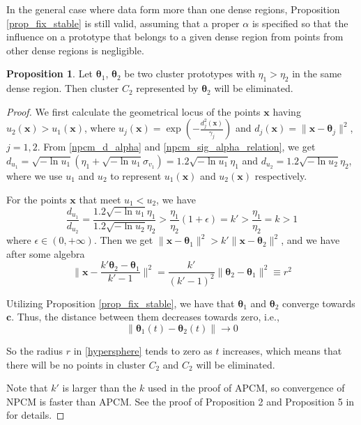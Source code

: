 \documentclass[conference]{IEEEtran}
\theoremstyle{definition}
\newtheorem*{proof}{Proof}
\newtheorem{prop}{Proposition}
\begin{document}
In the general case where data form more than one dense regions, Proposition \ref{prop_fix_stable} is still valid, assuming that a proper $\alpha$ is specified so that the influence on a prototype that belongs to a given dense region from points from other dense regions is negligible.

\begin{prop}
Let $\boldsymbol{\theta}_1$, $\boldsymbol{\theta}_2$ be two cluster prototypes with $\eta_1>\eta_2$ in the same dense region. Then cluster $C_2$ represented by $\boldsymbol{\theta}_2$ will be eliminated.
\label{prop_eliminate}
\end{prop}

\begin{proof}
 We first calculate the geometrical locus of the points $\mathbf{x}$ having $u_2(\mathbf{x})>u_1(\mathbf{x})$, where $u_j(\mathbf{x})=\exp\left(-\frac{d_j^2(\mathbf{x})}{\gamma_j}\right)$ and $d_j(\mathbf{x})=\|\mathbf{x} - \boldsymbol{\theta}_j\|^2$, $j=1,2$.
From \eqref{npcm_d_alpha} and \eqref{npcm_sig_alpha_relation}, we get $d_{u_1}=\sqrt{-\ln u_1}\left(\eta_1+\sqrt{-\ln u_1}\sigma_{v_1}\right)=1.2\sqrt{-\ln u_1}\eta_1$ and $d_{u_2}=1.2\sqrt{-\ln u_2}\eta_2$, where we use $u_1$ and $u_2$ to represent $u_1(\mathbf{x})$ and $u_2(\mathbf{x})$ respectively. 

For the points $\mathbf{x}$ that meet $u_1<u_2$, we have 
\begin{equation*}
\frac{d_{u_1}}{d_{u_2}}=\frac{1.2\sqrt{-\ln u_1}\eta_1}{1.2\sqrt{-\ln u_2}\eta_2}>\frac{\eta_1}{\eta_2}(1+\epsilon)=k'>\frac{\eta_1}{\eta_2}=k>1
\end{equation*}
where $\epsilon\in(0,+\infty)$. Then we get $\|\mathbf{x} - \boldsymbol{\theta}_1\|^2 > k'\|\mathbf{x} - \boldsymbol{\theta}_2\|^2$, and we have after some algebra
\begin{equation}
\label{hypersphere}
\|\mathbf{x}-\frac{k'\boldsymbol{\theta}_2-\boldsymbol{\theta}_1}{k'-1}\|^2 = \frac{k'}{(k'-1)^2}\|\boldsymbol{\theta}_2-\boldsymbol{\theta}_1\|^2\equiv r^2
\end{equation}

Utilizing Proposition \ref{prop_fix_stable}, we have that $\boldsymbol{\theta}_1$ and $\boldsymbol{\theta}_2$ converge towards $\mathbf{c}$. Thus, the distance between them decreases towards zero, i.e., 
\begin{equation}
\|\boldsymbol{\theta}_1(t)-\boldsymbol{\theta}_2(t)\|\rightarrow 0
\label{eqprop51}
\end{equation}          

So the radius $r$ in \eqref{hypersphere} tends to zero as $t$ increases, which means that there will be no points in cluster $C_2$ and $C_2$ will be eliminated.

Note that $k'$ is larger than the $k$ used in the proof of APCM, so convergence of NPCM is faster than APCM. 
See the proof of Proposition 2 and Proposition 5 in \cite{xenaki_novel_2016} for details.
\end{proof}






\end{document}
